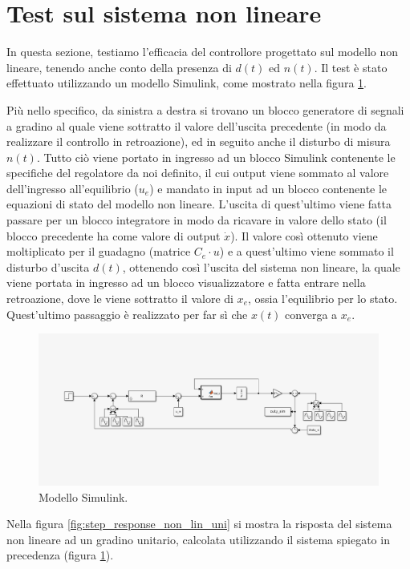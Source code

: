 \documentclass[a4paper, 11pt]{article}
\begin{document}
\section{Test sul sistema non lineare}

In questa sezione, testiamo l'efficacia del controllore progettato sul modello non lineare, tenendo anche conto della presenza di $d(t)$ ed $n(t)$. 
Il test \`e stato effettuato utilizzando un modello Simulink, come mostrato nella figura \ref*{fig:simulink}.

Pi\`u nello specifico,
da sinistra a destra si trovano un blocco generatore di segnali a gradino al quale viene sottratto il valore dell'uscita precedente (in modo da realizzare il controllo in retroazione), ed in seguito anche il disturbo di misura $n(t)$. 
Tutto ci\`o viene portato in ingresso ad un blocco Simulink contenente le specifiche del regolatore da noi definito, il cui output viene sommato al valore dell'ingresso all'equilibrio ($u_e$) e mandato in input ad un blocco contenente
le equazioni di stato del modello non lineare. L'uscita di quest'ultimo viene fatta passare per un blocco integratore in modo da ricavare in valore dello stato (il blocco precedente ha come valore di output $\dot{x}$). Il valore cos\`i ottenuto 
viene moltiplicato per il guadagno (matrice $C_e\cdot u$) e a quest'ultimo viene sommato il disturbo d'uscita $d(t)$, ottenendo cos\`i l'uscita del sistema non lineare, la quale viene portata in ingresso ad un blocco visualizzatore e fatta entrare nella retroazione,
dove le viene sottratto il valore di $x_e$, ossia l'equilibrio per lo stato. Quest'ultimo passaggio è realizzato per far sì che $x(t)$ converga a $x_e$.


\begin{figure}[h!]
	\centering
	\includegraphics[width=0.75\linewidth]{./images/simulink1.png}
	\caption{Modello Simulink.}
	\label{fig:simulink}
\end{figure}

Nella figura \ref*{fig:step_response_non_lin_uni} si mostra la risposta del sistema non lineare ad un gradino unitario, calcolata utilizzando il sistema spiegato in precedenza (figura \ref*{fig:simulink}).
\end{document}
